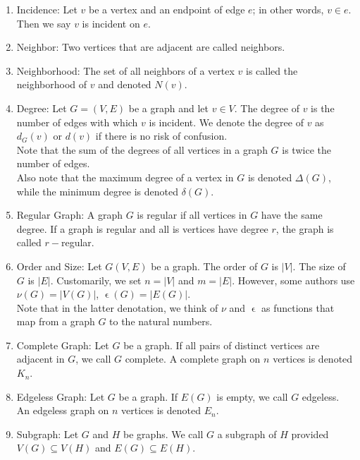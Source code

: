 \documentclass{article}
\begin{document}
\begin{enumerate}
    \item Incidence: Let $v$ be a vertex and an endpoint of edge $e$; in other words, $v\in e$. Then we say $v$ is incident on $e$.
    
    \item Neighbor: Two vertices that are adjacent are called neighbors.
    
    \item Neighborhood: The set of all neighbors of a vertex $v$ is called the neighborhood of $v$ and denoted $N(v)$.
    
    \item Degree: Let $G=(V,E)$ be a graph and let $v\in V$. The degree of $v$ is the number of edges with which $v$ is incident. We denote the degree of $v$ as $d_G(v)$ or $d(v)$ if there is no risk of confusion.\\
    
    Note that the sum of the degrees of all vertices in a graph $G$ is twice the number of edges.\\
    
    Also note that the maximum degree of a vertex in $G$ is denoted $\Delta(G)$, while the minimum degree is denoted $\delta(G)$.
    
    \item Regular Graph: A graph $G$ is regular if all vertices in $G$ have the same degree. If a graph is regular and all is vertices have degree $r$, the graph is called $r-$regular.
    
    \item Order and Size: Let $G(V,E)$ be a graph. The order of $G$ is $|V|$. The size of $G$ is $|E|$. Customarily, we set $n=|V|$ and $m=|E|$. However, some authors use $\nu(G)=|V(G)|$, $\upvarepsilon(G)=|E(G)|$.\\
    
    Note that in the latter denotation, we think of $\nu$ and $\upvarepsilon$ as functions that map from a graph $G$ to the natural numbers.

    \item Complete Graph: Let $G$ be a graph. If all pairs of distinct vertices are adjacent in $G$, we call $G$ complete. A complete graph on $n$ vertices is denoted $K_n$.
    
    \item Edgeless Graph: Let $G$ be a graph. If $E(G)$ is empty, we call $G$ edgeless. An edgeless graph on $n$ vertices is denoted $E_n$.
    
    \item Subgraph: Let $G$ and $H$ be graphs. We call $G$ a subgraph of $H$ provided $V(G)\subseteq V(H)$ and $E(G)\subseteq E(H)$.
    

\end{enumerate}
\end{document}
